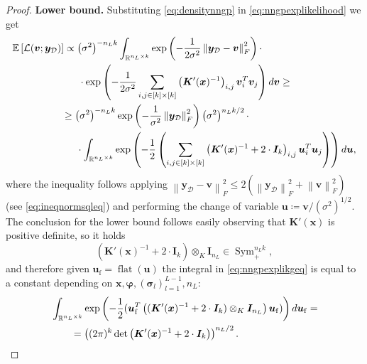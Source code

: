 \documentclass[a4paper, 11pt, reqno]{amsart}
\theoremstyle{plain}
\theoremstyle{remark}
\theoremstyle{definition}
\newcommand{\mean}[2][\kern-0.5pt]{\mathbb{E}_{#1}\left[#2\right]}
\newcommand{\real}{\mathbb{R}}
\newcommand{\norm}[1]{\left\lVert#1\right\rVert}
\renewcommand{\exp}[1]{\operatorname{exp}\left(#1\right)}
\renewcommand{\det}[1]{\operatorname{det}\left(#1\right)}
\newcommand{\flatten}[1]{\operatorname{flat}\left(#1\right)}
\newcommand{\blankeq}{\kern14.65pt}
\begin{document}
\begin{proof}
	\textbf{Lower bound.} Substituting \cref{eq:densitynngp} in \cref{eq:nngpexplikelihood} we get
	\begin{align} 
		& \begin{aligned} \label{eq:nngpexplikprop}
			\mean{\mathcal{L}(\bm{v}; \bm{y}_{\mathcal{D}})} & \propto \left(\sigma^2\right)^{- n_L k} \int_{\real^{n_L \times k}} \exp{-\frac{1}{2\sigma^2} \norm{\bm{y}_{\mathcal{D}} - \bm{v}}_F^2} \cdot \\
			& \blankeq \cdot \exp{-\frac{1}{2\sigma^2} \sum_{i, j \in [k] \times [k]} \left(\bm{K}'(\bm{x})^{-1}\right)_{i, j} \bm{v}_i^T \bm{v}_j} d\bm{v} \geq 
		\end{aligned} \\
		& \kern49.75pt \begin{aligned} \label{eq:nngpexplikgeq}
			& \geq \left(\sigma^2\right)^{- n_L k} \exp{-\frac{1}{\sigma^2} \norm{\bm{y}_{\mathcal{D}}}_F^2} \left(\sigma^2\right)^{n_L k /2} \cdot \\
			& \blankeq \cdot \int_{\real^{n_L \times k}} \exp{-\frac{1}{2} \left(\sum_{i, j \in [k] \times [k]} \left(\bm{K}'(\bm{x})^{-1} + 2 \cdot \bm{I}_k\right)_{i, j} \bm{u}_i^T \bm{u}_j\right)} d\bm{u},
		\end{aligned}
	\end{align}
	where the inequality follows applying $\norm{\bm{y}_{\mathcal{D}} - \bm{v}}_F^2 \leq 2(\norm{\bm{y}_{\mathcal{D}}}_F^2 + \norm{\bm{v}}_F^2)$ (see \cref{eq:ineqnormsqleq}) and performing the change of variable $\bm{u} \coloneqq \bm{v} / (\sigma^2)^{1/2}$. 
	The conclusion for the lower bound follows easily observing that $\bm{K}'(\bm{x})$ is positive definite, so it holds 
	\begin{equation*}
		(\bm{K}'(\bm{x})^{-1} + 2 \cdot \bm{I}_k) \otimes_K \bm{I}_{n_L} \in \operatorname{Sym}_+^{n_L k}, 
	\end{equation*}
	and therefore given $\bm{u}_{\mathrm{f}} = \flatten{\bm{u}}$ the integral in \cref{eq:nngpexplikgeq} is equal to a constant depending on $\bm{x}, \bm{\varphi}, \left(\bm{\sigma}_l\right)_{l = 1}^{L - 1}, n_L$: 
	\begin{equation} \label{eq:boundinfthetaprime}
		\begin{aligned}
			& \int_{\real^{n_L \times k}} \exp{-\frac{1}{2} (\bm{u}_{\mathrm{f}}^T \left((\bm{K}'(\bm{x})^{-1} + 2 \cdot \bm{I}_k) \otimes_K \bm{I}_{n_L}\right) \bm{u}_{\mathrm{f}})} d\bm{u}_{\mathrm{f}} = \\
			& \kern20pt = \left((2\pi)^{k} \det{\bm{K}'(\bm{x})^{-1} + 2 \cdot \bm{I}_k}\right)^{n_L / 2}.
		\end{aligned}
	\end{equation}   
	

\end{proof}
\end{document}
